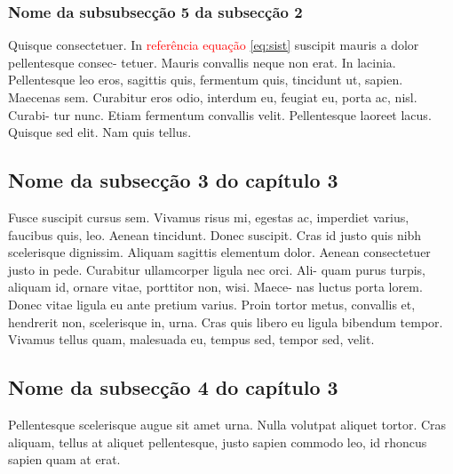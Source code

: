\subsubsection{Nome da subsubsecção 5 da subsecção 2}
Quisque consectetuer. In \textcolor{red}{referência equação} \ref{eq:sist} suscipit mauris a dolor pellentesque consec- tetuer. Mauris convallis neque non erat. In lacinia. Pellentesque leo eros, sagittis quis, fermentum quis, tincidunt ut, sapien. Maecenas sem. Curabitur eros odio, interdum eu, feugiat eu, porta ac, nisl. Curabi- tur nunc. Etiam fermentum convallis velit. Pellentesque laoreet lacus. Quisque sed elit. Nam quis tellus.

\subsection{Nome da subsecção 3 do capítulo 3}
Fusce suscipit cursus sem. Vivamus risus mi, egestas ac, imperdiet varius, faucibus quis, leo. Aenean tincidunt. Donec suscipit. Cras id justo quis nibh scelerisque dignissim. Aliquam sagittis elementum dolor. Aenean consectetuer justo in pede. Curabitur ullamcorper ligula nec orci. Ali- quam purus turpis, aliquam id, ornare vitae, porttitor non, wisi. Maece- nas luctus porta lorem. Donec vitae ligula eu ante pretium varius. Proin tortor metus, convallis et, hendrerit non, scelerisque in, urna. Cras quis libero eu ligula bibendum tempor. Vivamus tellus quam, malesuada eu, tempus sed, tempor sed, velit.

\subsection{Nome da subsecção 4 do capítulo 3}
Pellentesque scelerisque augue sit amet urna. Nulla volutpat aliquet tortor. Cras aliquam, tellus at aliquet pellentesque, justo sapien commodo leo, id rhoncus sapien quam at erat.
